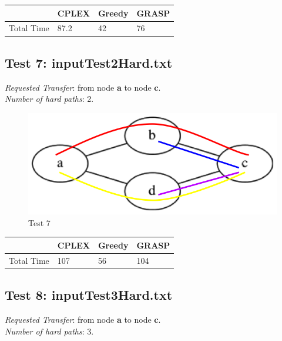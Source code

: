 \documentclass[11pt,a4paper]{article}
\begin{document}
\begin{tabular}{| l | l | l | l |}
\hline
 & CPLEX & Greedy & GRASP \\ \hline
Total Time & 87.2 & 42 & 76 \\ \hline
\end{tabular}

\subsection{Test 7: inputTest2Hard.txt}

\textit{Requested Transfer}: from node \textbf{a} to node \textbf{c}.\\
\textit{Number of hard paths}: 2.\\

\begin{figure}[H]
  \centering
    \includegraphics[scale=0.7]{inputTest2Hard.png}
  \caption{Test 7}
  \label{fig:test7}
\end{figure}

\begin{tabular}{| l | l | l | l |}
\hline
 & CPLEX & Greedy & GRASP \\ \hline
Total Time & 107 & 56 & 104 \\ \hline
\end{tabular}

\subsection{Test 8: inputTest3Hard.txt}

\textit{Requested Transfer}: from node \textbf{a} to node \textbf{c}.\\
\textit{Number of hard paths}: 3.\\
\end{document}
